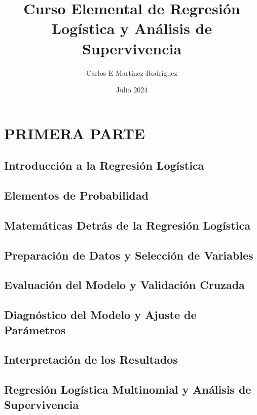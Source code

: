 \documentclass{report}
\title{Curso Elemental de Regresi\'on Logística y Análisis de Supervivencia}
\author{Carlos E Mart\'inez-Rodr\'iguez}
\date{Julio 2024}
\begin{document}
\maketitle

\tableofcontents

\part{PRIMERA PARTE}
\chapter{Introducci\'on a la Regresi\'on Logística}


\chapter{Elementos de Probabilidad}


\chapter{Matem\'aticas Detr\'as de la Regresi\'on Logística}


\chapter{Preparaci\'on de Datos y Selecci\'on de Variables}


\chapter{Evaluaci\'on del Modelo y Validaci\'on Cruzada}


\chapter{Diagn\'ostico del Modelo y Ajuste de Par\'ametros}


\chapter{Interpretaci\'on de los Resultados}


\chapter{Regresi\'on Logística Multinomial y An\'alisis de Supervivencia}

\end{document}
